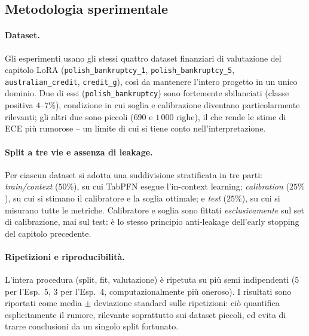 \documentclass[11pt,a4paper]{article}
\begin{document}
\subsection{Metodologia sperimentale}
\label{sec:pipeline-metodo}

\paragraph{Dataset.} Gli esperimenti usano gli stessi quattro dataset finanziari
di valutazione del capitolo LoRA (\texttt{polish\_bankruptcy\_1},
\texttt{polish\_bankruptcy\_5}, \texttt{australian\_credit}, \texttt{credit\_g}),
così da mantenere l'intero progetto in un unico dominio. Due di essi
(\texttt{polish\_bankruptcy}) sono fortemente sbilanciati (classe positiva
$4$--$7\%$), condizione in cui soglia e calibrazione diventano particolarmente
rilevanti; gli altri due sono piccoli ($690$ e $1\,000$ righe), il che rende le
stime di ECE più rumorose -- un limite di cui si tiene conto
nell'interpretazione.

\paragraph{Split a tre vie e assenza di leakage.} Per ciascun dataset si adotta
una suddivisione stratificata in tre parti: \emph{train/context}
($50\%$), su cui TabPFN esegue l'in-context learning; \emph{calibration}
($25\%$), su cui si stimano il calibratore e la soglia ottimale; e \emph{test}
($25\%$), su cui si misurano tutte le metriche. Calibratore e soglia sono
fittati \emph{esclusivamente} sul set di calibrazione, mai sul test: è lo stesso
principio anti-leakage dell'early stopping del capitolo precedente.

\paragraph{Ripetizioni e riproducibilità.} L'intera procedura (split, fit,
valutazione) è ripetuta su più semi indipendenti ($5$ per l'Esp.~5, $3$ per
l'Esp.~4, computazionalmente più oneroso). I risultati sono riportati come
media $\pm$ deviazione standard sulle ripetizioni: ciò quantifica esplicitamente
il rumore, rilevante soprattutto sui dataset piccoli, ed evita di trarre
conclusioni da un singolo split fortunato.
\end{document}
